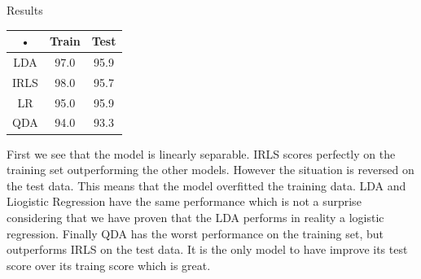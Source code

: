 \documentclass[a4paper]{article}
\begin{document}
\begin{minipage}[c]{0,35\textwidth}
Results\\
\begin{tabular}{|c|c|c|}
\hline 
• & Train & Test \\ 
\hline 
LDA & 97.0 & 95.9 \\ 
\hline 
IRLS & 98.0 & 95.7 \\ 
\hline 
LR & 95.0 & 95.9 \\ 
\hline 
QDA & 94.0 & 93.3 \\ 
\hline 
\end{tabular} 
\end{minipage}
\begin{minipage}{0,6\textwidth}
First we see that the model is linearly separable. IRLS scores perfectly on the training set outperforming the other models. However the situation is reversed on the test data. This means that the model overfitted the training data. LDA and Liogistic Regression have the same performance which is not a surprise considering that we have proven that the LDA performs in reality a logistic regression. Finally QDA has the worst performance on the training set, but outperforms IRLS on the test data. It is the only model to have improve its test score over its traing score which is great.
\end{minipage}
\newpage
\end{document}

